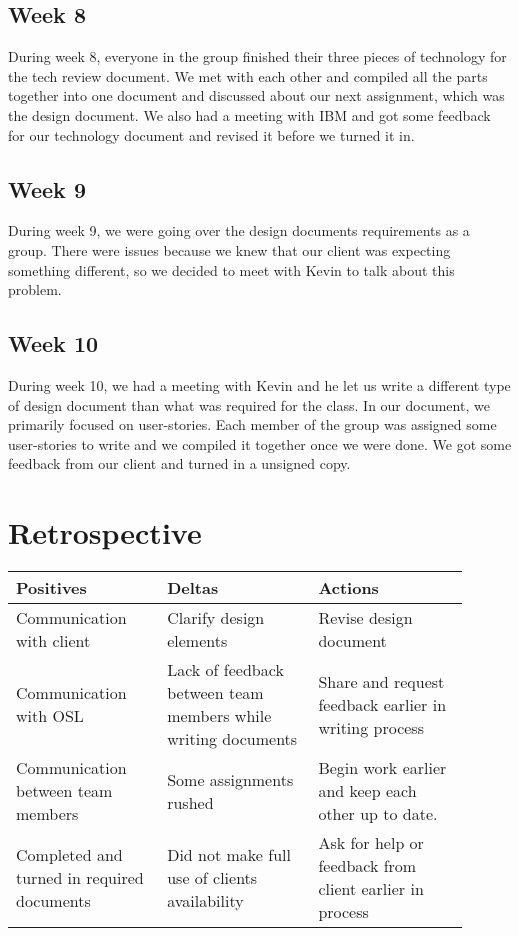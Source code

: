 \documentclass[10pt,onecolumn,journal,draftclsnofoot]{IEEEtran}
\begin{document}
\subsection{Week 8}
During week 8, everyone in the group finished their three pieces of technology for the tech review document. We met with each other and compiled all the parts together into one document and discussed about our next assignment, which was the design document. We also had a meeting with IBM and got some feedback for our technology document and revised it before we turned it in.

\subsection{Week 9}
During week 9, we were going over the design documents requirements as a group. There were issues because we knew that our client was expecting something different, so we decided to meet with Kevin to talk about this problem.

\subsection{Week 10}
During week 10, we had a meeting with Kevin and he let us write a different type of design document than what was required for the class. In our document, we primarily focused on user-stories. Each member of the group was assigned some user-stories to write and we compiled it together once we were done. We got some feedback from our client and turned in a unsigned copy.

\section{Retrospective}
\begin{center}
	\begin{tabular}{| p{0.3\linewidth} | p{0.3\linewidth} | p{0.3\linewidth} |}\hline
		Positives & Deltas & Actions \\ \hline
		Communication with client & Clarify design elements 	& Revise design document \\ \hline
		Communication with OSL & Lack of feedback between team members while writing documents & Share and request feedback earlier in writing process \\ \hline
		Communication between team members	& Some assignments rushed & Begin work earlier and keep each other up to date. \\ \hline
		Completed and turned in required documents & Did not make full use of clients availability & Ask for help or feedback from client earlier in process \\ \hline
	\end{tabular}
\end{center}
\end{document}
